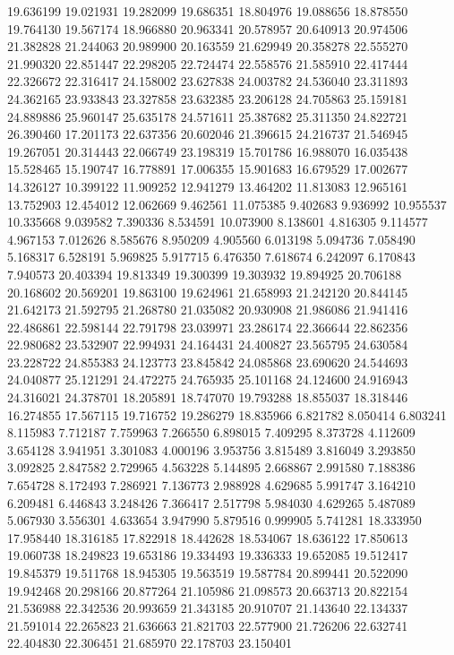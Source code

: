 19.636199
19.021931
19.282099
19.686351
18.804976
19.088656
18.878550
19.764130
19.567174
18.966880
20.963341
20.578957
20.640913
20.974506
21.382828
21.244063
20.989900
20.163559
21.629949
20.358278
22.555270
21.990320
22.851447
22.298205
22.724474
22.558576
21.585910
22.417444
22.326672
22.316417
24.158002
23.627838
24.003782
24.536040
23.311893
24.362165
23.933843
23.327858
23.632385
23.206128
24.705863
25.159181
24.889886
25.960147
25.635178
24.571611
25.387682
25.311350
24.822721
26.390460
17.201173
22.637356
20.602046
21.396615
24.216737
21.546945
19.267051
20.314443
22.066749
23.198319
15.701786
16.988070
16.035438
15.528465
15.190747
16.778891
17.006355
15.901683
16.679529
17.002677
14.326127
10.399122
11.909252
12.941279
13.464202
11.813083
12.965161
13.752903
12.454012
12.062669
9.462561
11.075385
9.402683
9.936992
10.955537
10.335668
9.039582
7.390336
8.534591
10.073900
8.138601
4.816305
9.114577
4.967153
7.012626
8.585676
8.950209
4.905560
6.013198
5.094736
7.058490
5.168317
6.528191
5.969825
5.917715
6.476350
7.618674
6.242097
6.170843
7.940573
20.403394
19.813349
19.300399
19.303932
19.894925
20.706188
20.168602
20.569201
19.863100
19.624961
21.658993
21.242120
20.844145
21.642173
21.592795
21.268780
21.035082
20.930908
21.986086
21.941416
22.486861
22.598144
22.791798
23.039971
23.286174
22.366644
22.862356
22.980682
23.532907
22.994931
24.164431
24.400827
23.565795
24.630584
23.228722
24.855383
24.123773
23.845842
24.085868
23.690620
24.544693
24.040877
25.121291
24.472275
24.765935
25.101168
24.124600
24.916943
24.316021
24.378701
18.205891
18.747070
19.793288
18.855037
18.318446
16.274855
17.567115
19.716752
19.286279
18.835966
6.821782
8.050414
6.803241
8.115983
7.712187
7.759963
7.266550
6.898015
7.409295
8.373728
4.112609
3.654128
3.941951
3.301083
4.000196
3.953756
3.815489
3.816049
3.293850
3.092825
2.847582
2.729965
4.563228
5.144895
2.668867
2.991580
7.188386
7.654728
8.172493
7.286921
7.136773
2.988928
4.629685
5.991747
3.164210
6.209481
6.446843
3.248426
7.366417
2.517798
5.984030
4.629265
5.487089
5.067930
3.556301
4.633654
3.947990
5.879516
0.999905
5.741281
18.333950
17.958440
18.316185
17.822918
18.442628
18.534067
18.636122
17.850613
19.060738
18.249823
19.653186
19.334493
19.336333
19.652085
19.512417
19.845379
19.511768
18.945305
19.563519
19.587784
20.899441
20.522090
19.942468
20.298166
20.877264
21.105986
21.098573
20.663713
20.822154
21.536988
22.342536
20.993659
21.343185
20.910707
21.143640
22.134337
21.591014
22.265823
21.636663
21.821703
22.577900
21.726206
22.632741
22.404830
22.306451
21.685970
22.178703
23.150401
